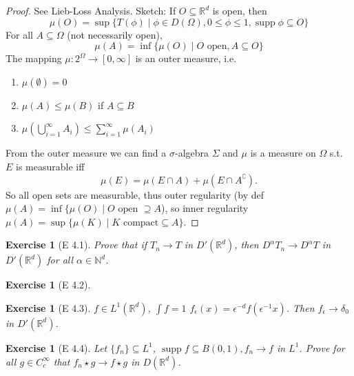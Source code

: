 \documentclass{report}
\theoremstyle{tommy}
\newtheorem{ex}[defn]{Exercise}
\newcommand{\supp}{\operatorname{supp}}
\begin{document}
  \begin{proof}See Lieb-Loss Analysis. Sketch: If \(O \subseteq \mathbb{R}^d\) is open, then 
    \[\mu(O) = \sup \{T(\phi) \mid \phi \in D(\Omega), 0 \le \phi \le 1, \supp \phi \subseteq O\}\]
    For all \(A \subseteq \Omega\) (not necessarily open),
    \[\mu(A) = \inf \{\mu(O) \mid O \text{ open}, A \subseteq O\}\]
    The mapping \(\mu: 2^\Omega \to [0, \infty]\) is an outer measure, i.e.
    \begin{enumerate}
      \item \(\mu(\emptyset) = 0\)
      \item \(\mu(A) \le \mu(B)\) if \(A \subseteq B\)
      \item \(\mu \left(\bigcup_{i=1}^\infty A_i\right) \le \sum_{i=1}^\infty \mu(A_i)\)
    \end{enumerate}
    From the outer measure we can find a \(\sigma\)-algebra \(\Sigma\) and \(\mu\) is a measure on \(\Omega\) s.t. \(E\) is measurable iff \[\mu(E) = \mu(E \cap A) + \mu(E \cap A^\complement).\]
    So all open sets are measurable, thus outer regularity (by def \(\mu(A) = \inf\{\mu(O) \mid O \text{ open } \supseteq A\)), so inner regularity \(\mu(A) = \sup\{\mu(K) \mid K \text{ compact} \subseteq A\}\). 
  \end{proof}

  \begin{ex}[E 4.1]
    Prove that if \(T_n \to T\) in \(D'(\mathbb{R}^d)\), then \(D^\alpha T_n  \to D^\alpha T\) in \(D'(\mathbb{R}^d)\) for all \(\alpha \in \mathbb{N}^d\).
  \end{ex}

  \begin{ex}[E 4.2]
  \end{ex}

  \begin{ex}[E 4.3]
    \(f \in L^1(\mathbb{R}^d)\), \(\int f = 1\) \(f_\epsilon(x) = \epsilon^{-d} f(\epsilon^{-1}x)\). Then \(f_\epsilon \to \delta_0\) in \(D'(\mathbb{R}^d)\). 
  \end{ex}

  \begin{ex}[E 4.4]
    Let \(\{f_n\} \subseteq L^1\), \(\supp f \subseteq B(0,1), f_n \to f\) in \(L^1\). Prove for all \(g \in C_c^\infty\) that \(f_n \star g \to f \star g\) in \(D(\mathbb{R}^d)\).
  \end{ex}
\end{document}
